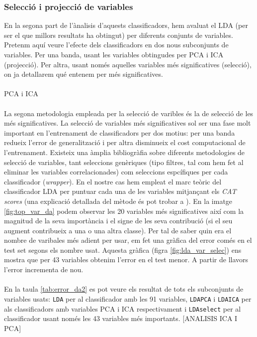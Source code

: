 \documentclass[a4paper,10pt]{article}
\begin{document}
\subsubsection{Selecció i projecció de variables}
En la segona part de l'ànalisis d'aquests classificadors, hem avaluat el LDA (per ser el que millors resultats ha obtingut) per diferents conjunts de variables. Pretenm aquí veure l'efecte dels classificadors en dos nous subconjunts de variables. Per una banda, usant les variables obtingudes per PCA i ICA (projecció). Per altra, usant només aquelles variables més significatives (selecció), on ja detallarem qué entenem per més significatives.  
\\
\\
PCA i ICA
\\
\\
La segona metodologia empleada per la selecció de varibles és la de selecció de les més significatives. La selecció de variables més significatives sol ser una fase molt important en l'entrenament de classificadors per dos motius: per una banda redueix l'error de generalització i per altra disminueix el cost computacional de l'entrenament. Existeix una àmplia bibliogràfia sobre diferents metodologies de selecció de variables, tant seleccions genèriques (tipo filtres, tal com hem fet al eliminar les variables correlacionades) com seleccions espcífiques per cada classificador (\textit{wrapper}). En el nostre cas hem empleat el marc teòric del classificador LDA per puntuar cada una de les variables mitjançant els \textit{CAT scores} (una explicació detallada del mètode és pot trobar a \cite{strimmer10}). En la imatge \ref{fig:top_var_da} podem observar les 20 variables més significatives així com la magnitud de la seva importància i el signe de les seva contribució (si el seu augment contribueix a una o una altra classe). Per tal de saber quin era el nombre de varibales més adient per usar, em fet una gràfica del error comés en el test set segons els nombre usat. Aquesta gràfica (figra \ref{fig:lda_var_selec}) ens mostra que per 43 variables obtenim l'error en el test menor. A partir de llavors l'error incrementa de nou.
\\
\\
En la taula \ref{tab:error_da2} es pot veure els resultat de tots els subconjunts de variables usats: \texttt{LDA} per al classificador amb les 91 variables, \texttt{LDAPCA} i \texttt{LDAICA} per als classificadors amb variables PCA i ICA respectivament i \texttt{LDAselect} per al classificador usant només les 43 variables més importants. [ANALISIS ICA I PCA]
\end{document}
